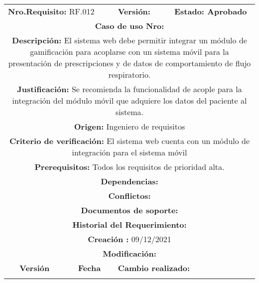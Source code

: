\begin{center}
\begin{tabular}{|c|c|p{4cm}|p{4cm}|}
            \hline
            \rowcolor{red} \multicolumn{4}{|c|}{\textbf{Prioridad:} Alta}  \\
            \hline
            \multicolumn{2}{|l}{\textbf{Nro.Requisito: }RF.012} & \multicolumn{1}{|l}{\textbf{Versión: }} & \multicolumn{1}{|l|}{\textbf{Estado: Aprobado}} \\
            \multicolumn{4}{|p{13cm}|}{\textbf{Caso de uso Nro: }}  \\
            \hline
            \multicolumn{4}{|p{13cm}|}{\textbf{Descripción: } El sistema web debe permitir integrar un módulo de gamificación para acoplarse con un sistema móvil para la presentación de prescripciones y de datos de comportamiento de flujo respiratorio. } \\
            \multicolumn{4}{|p{13cm}|}{\textbf{Justificación: } Se recomienda la funcionalidad de acople para la integración del módulo móvil que adquiere los datos del paciente  al sistema.} \\ 
            \multicolumn{4}{|p{13cm}|}{\textbf{Origen: }Ingeniero de requisitos}  \\
            \multicolumn{4}{|p{13cm}|}{\textbf{Criterio de verificación: } El sistema web cuenta con un módulo de integración para el sistema móvil} \\
            \hline
            \multicolumn{4}{|p{13cm}|}{\textbf{Prerequisitos: } Todos los requisitos de prioridad alta. }\\
            \hline \multicolumn{4}{|p{12cm}|}{\textbf{Dependencias: }
               
              }  \\
            \multicolumn{4}{|p{12cm}|}{\textbf{Conflictos: }}  \\
            \hline
            \multicolumn{4}{|p{12cm}|}{\textbf{Documentos de soporte: }}  \\
            \hline
            \multicolumn{4}{|p{12cm}|}{\textbf{Historial del Requerimiento: }}  \\
            \multicolumn{4}{|p{12cm}|}{\textbf{Creación : }09/12/2021}  \\
            \multicolumn{4}{|p{12cm}|}{\textbf{Modificación: }}  \\
             \textbf{Versión} & \textbf{Fecha} & \multicolumn{2}{p{8cm}|}{\textbf{Cambio realizado:}} \\
            \hline
                 & &   \multicolumn{2}{p{8cm}|}{}
              \\
            \hline
\end{tabular}




\end{center}
